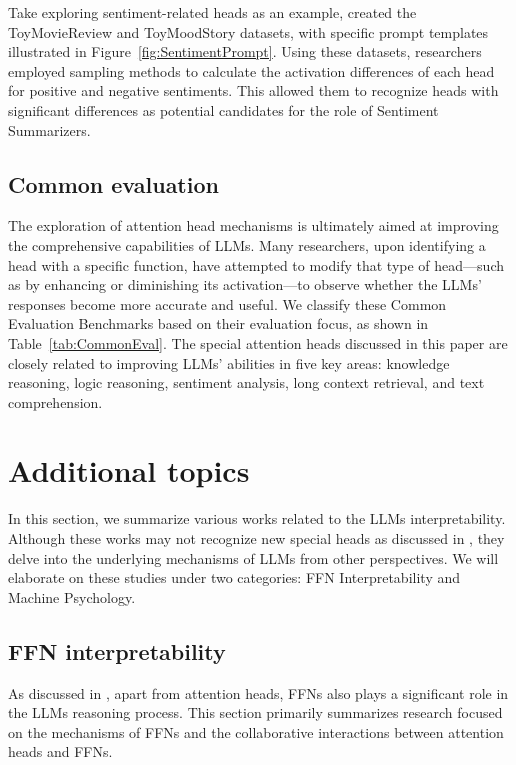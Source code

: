 \documentclass[12pt,letterpaper]{article}
\begin{document}
Take exploring sentiment-related heads as an example, \citet{Sentiment_23_arXiv_EleutherAI} created the ToyMovieReview and ToyMoodStory datasets, with specific prompt templates illustrated in Figure~\ref{fig:SentimentPrompt}. Using these datasets, researchers employed sampling methods to calculate the activation differences of each head for positive and negative sentiments. This allowed them to recognize heads with significant differences as potential candidates for the role of Sentiment Summarizers.


\subsection*{Common evaluation}


The exploration of attention head mechanisms is ultimately aimed at improving the comprehensive capabilities of LLMs. Many researchers, upon identifying a head with a specific function, have attempted to modify that type of head—such as by enhancing or diminishing its activation—to observe whether the LLMs' responses become more accurate and useful. We classify these Common Evaluation Benchmarks based on their evaluation focus, as shown in Table~\ref{tab:CommonEval}. The special attention heads discussed in this paper are closely related to improving LLMs' abilities in five key areas: knowledge reasoning, logic reasoning, sentiment analysis, long context retrieval, and text comprehension.


\section*{Additional topics} \label{sec:other_tasks}
In this section, we summarize various works related to the LLMs interpretability. Although these works may not recognize new special heads as discussed in , they delve into the underlying mechanisms of LLMs from other perspectives. We will elaborate on these studies under two categories: FFN Interpretability and Machine Psychology.

\subsection*{FFN interpretability} \label{subsec:OtherComponent}
As discussed in , apart from attention heads, FFNs also plays a significant role in the LLMs reasoning process. This section primarily summarizes research focused on the mechanisms of FFNs and the collaborative interactions between attention heads and FFNs.
\end{document}
